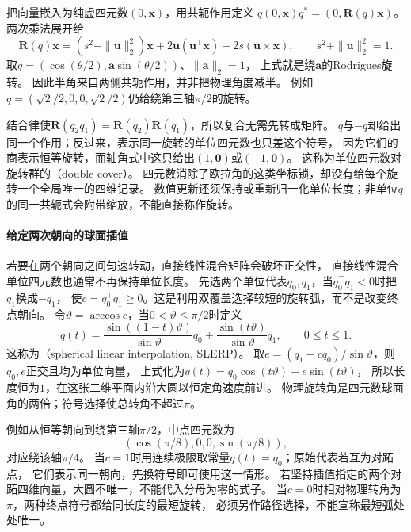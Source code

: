 把向量嵌入为纯虚四元数$(0,\bm x)$，用共轭作用定义
$q(0,\bm x)q^*=(0,\bm R(q)\bm x)$。
两次乘法展开给
\begin{equation}
 \bm R(q)\bm x
 =(s^2-\|\bm u\|_2^2)\bm x
 +2\bm u(\bm u^\top\bm x)+2s(\bm u\times\bm x),
 \qquad s^2+\|\bm u\|_2^2=1.
 \label{eq:geometry-quaternion-action}
\end{equation}
取$q=(\cos(\theta/2),\bm a\sin(\theta/2))$、$\|\bm a\|_2=1$，
上式就是绕$\bm a$的Rodrigues旋转。
因此半角来自两侧共轭作用，并非把物理角度减半。
例如$q=(\sqrt2/2,0,0,\sqrt2/2)$仍给绕第三轴$\pi/2$的旋转。

结合律使$\bm R(q_2q_1)=\bm R(q_2)\bm R(q_1)$，所以复合无需先转成矩阵。
$q$与$-q$却给出同一个作用；反过来，表示同一旋转的单位四元数也只差这个符号，
因为它们的商表示恒等旋转，而轴角式中这只给出$(1,\bm0)$或$(-1,\bm0)$。
这称为单位四元数对旋转群的（double cover）。
四元数消除了欧拉角的这类坐标锁，却没有给每个旋转一个全局唯一的四维记录。
数值更新还须保持或重新归一化单位长度；非单位$q$的同一共轭式会附带缩放，不能直接称作旋转。

\paragraph{给定两次朝向的球面插值}
若要在两个朝向之间匀速转动，直接线性混合矩阵会破坏正交性，
直接线性混合单位四元数也通常不再保持单位长度。
先选两个单位代表$q_0,q_1$，当$q_0^\top q_1<0$时把$q_1$换成$-q_1$，
使$c=q_0^\top q_1\geq0$。这是利用双覆盖选择较短的旋转弧，而不是改变终点朝向。
令$\vartheta=\arccos c$，当$0<\vartheta\leq\pi/2$时定义
\begin{equation}
 q(t)=\frac{\sin((1-t)\vartheta)}{\sin\vartheta}q_0
       +\frac{\sin(t\vartheta)}{\sin\vartheta}q_1,
 \qquad 0\leq t\leq1.
 \label{eq:geometry-quaternion-slerp}
\end{equation}
这称为（spherical linear interpolation, SLERP）。
取$e=(q_1-cq_0)/\sin\vartheta$，则$q_0,e$正交且均为单位向量，
上式化为$q(t)=q_0\cos(t\vartheta)+e\sin(t\vartheta)$，
所以长度恒为$1$，在这张二维平面内沿大圆以恒定角速度前进。
物理旋转角是四元数球面角的两倍；符号选择使总转角不超过$\pi$。

例如从恒等朝向到绕第三轴$\pi/2$，中点四元数为
\[
 (\cos(\pi/8),0,0,\sin(\pi/8)),
\]
对应绕该轴$\pi/4$。
当$c=1$时用连续极限取常量$q(t)=q_0$；原始代表若互为对跖点，
它们表示同一朝向，先换符号即可使用这一情形。
若坚持插值指定的两个对跖四维向量，大圆不唯一，不能代入分母为零的式子。
当$c=0$时相对物理转角为$\pi$，两种终点符号都给同长度的最短旋转，
必须另作路径选择，不能宣称最短弧处处唯一。

